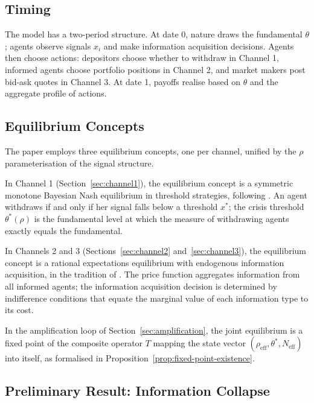 \subsection{Timing}
\label{sec:model-timing}

The model has a two-period structure. At date 0, nature draws the fundamental $\theta$; agents observe signals $x_i$ and make information acquisition decisions. Agents then choose actions: depositors choose whether to withdraw in Channel 1, informed agents choose portfolio positions in Channel 2, and market makers post bid-ask quotes in Channel 3. At date 1, payoffs realise based on $\theta$ and the aggregate profile of actions.

\subsection{Equilibrium Concepts}
\label{sec:model-equil}

The paper employs three equilibrium concepts, one per channel, unified by the $\rho$ parameterisation of the signal structure.

In Channel 1 (Section~\ref{sec:channel1}), the equilibrium concept is a symmetric monotone Bayesian Nash equilibrium in threshold strategies, following \citet{goldstein2005}. An agent withdraws if and only if her signal falls below a threshold $x^*$; the crisis threshold $\theta^*(\rho)$ is the fundamental level at which the measure of withdrawing agents exactly equals the fundamental.

In Channels 2 and 3 (Sections~\ref{sec:channel2} and~\ref{sec:channel3}), the equilibrium concept is a rational expectations equilibrium with endogenous information acquisition, in the tradition of \citet{grossman1980}. The price function aggregates information from all informed agents; the information acquisition decision is determined by indifference conditions that equate the marginal value of each information type to its cost.

In the amplification loop of Section~\ref{sec:amplification}, the joint equilibrium is a fixed point of the composite operator $T$ mapping the state vector $(\rho_{\text{eff}}, \theta^*, N_{\text{eff}})$ into itself, as formalised in Proposition~\ref{prop:fixed-point-existence}.

\subsection{Preliminary Result: Information Collapse}
\label{sec:model-collapse}

